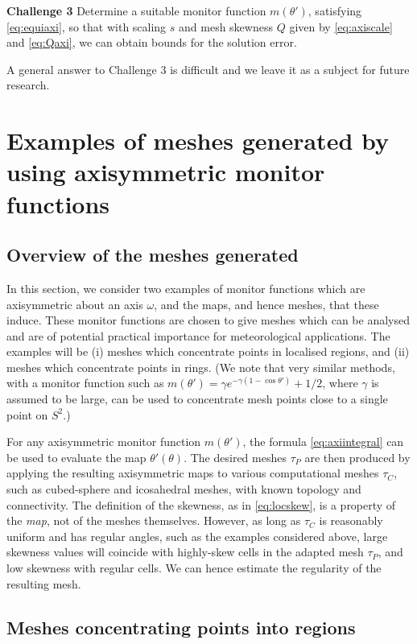 \documentclass[11pt, a4paper]{scrartcl}  %
\theoremstyle{plain}
\theoremstyle{definition}
\numberwithin{equation}{section}
\begin{document}
\textbf{Challenge 3} Determine a suitable monitor function $m(\theta')$,
satisfying \cref{eq:equiaxi}, so that with scaling $s$ and mesh skewness
$Q$ given by \cref{eq:axiscale} and \cref{eq:Qaxi}, we can obtain bounds
for the solution error.

A general answer to  Challenge 3 is difficult and we leave it as a
subject for future research.

\section{Examples of meshes generated by using axisymmetric monitor functions}
\label{sec:numaxi}

\subsection{Overview of the meshes generated}
In this section, we consider two examples of monitor functions which are
axisymmetric about an axis $\omega$, and the maps, and hence meshes,
that these induce. These monitor functions are chosen to give meshes
which can be analysed and are of potential practical importance for
meteorological applications. The examples will be (i) meshes which
concentrate points in localised regions, and (ii) meshes which
concentrate points in rings. (We note that very similar methods, with a
monitor function such as $m(\theta') = \gamma e^{-\gamma(1 - \cos\theta')} + 1/2$,
where $\gamma$ is assumed to be large, can be used to concentrate mesh
points close to a single point on $S^2$.)

For any axisymmetric monitor function $m(\theta')$, the formula
\cref{eq:axiintegral} can be used to evaluate the map $\theta'(\theta)$.
The desired meshes $\tau_P$ are then produced by applying the resulting
axisymmetric maps to various computational meshes $\tau_C$, such as
cubed-sphere and icosahedral meshes, with known topology and
connectivity. The definition of the skewness, as in
\cref{eq:locskew}, is a property of the \emph{map}, not of the meshes
themselves. However, as long as $\tau_C$ is reasonably uniform and has
regular angles, such as the examples considered above, large skewness
values will coincide with highly-skew cells in the adapted mesh
$\tau_P$, and low skewness with regular cells. We can hence estimate the
regularity of the resulting mesh.

\subsection{Meshes concentrating points into regions}
\end{document}
